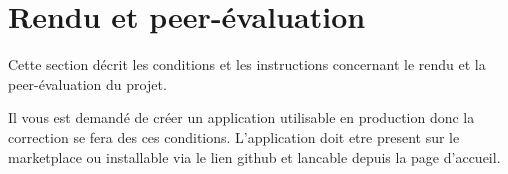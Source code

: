 \documentclass{42}
\begin{document}
\chapter{Rendu et peer-\'evaluation}

    Cette section d\'ecrit les conditions et les instructions
    concernant le rendu et la peer-\'evaluation du projet.\newline


    Il  vous est demand\'e de cr\'eer un application utilisable en production
    donc la correction se fera des ces conditions. L'application doit etre
    present sur le marketplace ou installable via le lien github et lancable
    depuis la page d'accueil.
\end{document}
